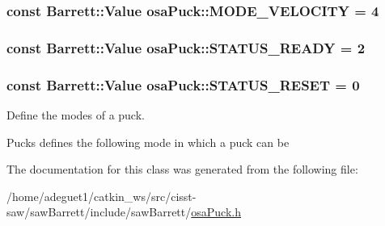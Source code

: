 \hypertarget{classosa_puck_a34b1e12b935b2890de3a86a5a8735733}{
\subsubsection[{M\-O\-D\-E\-\_\-\-V\-E\-L\-O\-C\-I\-T\-Y}]{\setlength{\rightskip}{0pt plus 5cm}const {\bf Barrett\-::\-Value} osa\-Puck\-::\-M\-O\-D\-E\-\_\-\-V\-E\-L\-O\-C\-I\-T\-Y = 4\hspace{0.3cm}{\ttfamily [static]}}}\label{classosa_puck_a34b1e12b935b2890de3a86a5a8735733}
\hypertarget{classosa_puck_a0d02e251c5e3c54e0511cbb6d87dc619}{
\subsubsection[{S\-T\-A\-T\-U\-S\-\_\-\-R\-E\-A\-D\-Y}]{\setlength{\rightskip}{0pt plus 5cm}const {\bf Barrett\-::\-Value} osa\-Puck\-::\-S\-T\-A\-T\-U\-S\-\_\-\-R\-E\-A\-D\-Y = 2\hspace{0.3cm}{\ttfamily [static]}}}\label{classosa_puck_a0d02e251c5e3c54e0511cbb6d87dc619}
\hypertarget{classosa_puck_ada7927c208d1f07285d12074998bbf4c}{
\subsubsection[{S\-T\-A\-T\-U\-S\-\_\-\-R\-E\-S\-E\-T}]{\setlength{\rightskip}{0pt plus 5cm}const {\bf Barrett\-::\-Value} osa\-Puck\-::\-S\-T\-A\-T\-U\-S\-\_\-\-R\-E\-S\-E\-T = 0\hspace{0.3cm}{\ttfamily [static]}}}\label{classosa_puck_ada7927c208d1f07285d12074998bbf4c}


Define the modes of a puck. 

Pucks defines the following mode in which a puck can be 

The documentation for this class was generated from the following file\-:\begin{DoxyCompactItemize}
\item 
/home/adeguet1/catkin\-\_\-ws/src/cisst-\/saw/saw\-Barrett/include/saw\-Barrett/\hyperlink{osa_puck_8h}{osa\-Puck.\-h}\end{DoxyCompactItemize}
